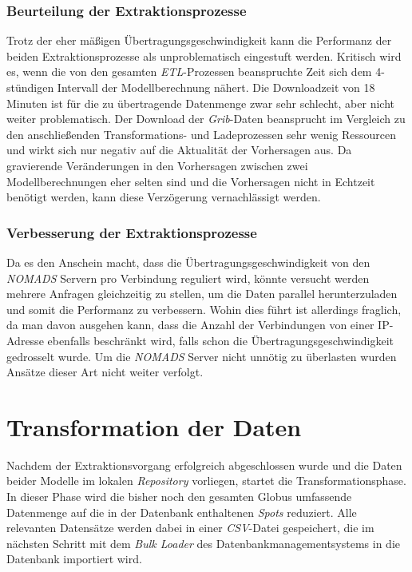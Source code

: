 \subsubsection{Beurteilung der Extraktionsprozesse}
Trotz der eher mäßigen Übertragungsgeschwindigkeit kann die Performanz
der beiden Extraktionsprozesse als unproblematisch eingestuft
werden. Kritisch wird es, wenn die von den gesamten
\textit{ETL}-Prozessen beanspruchte Zeit sich dem 4-stündigen
Intervall der Modellberechnung nähert. Die Downloadzeit von 18 Minuten
ist für die zu übertragende Datenmenge zwar sehr schlecht, aber nicht
weiter problematisch. Der Download der \textit{Grib}-Daten beansprucht
im Vergleich zu den anschließenden Transformations- und Ladeprozessen
sehr wenig Ressourcen und wirkt sich nur negativ auf die Aktualität
der Vorhersagen aus. Da gravierende Veränderungen in den Vorhersagen
zwischen zwei Modellberechnungen eher selten sind und die Vorhersagen
nicht in Echtzeit benötigt werden, kann diese Verzögerung
vernachlässigt werden. 

\subsubsection{Verbesserung der Extraktionsprozesse}
Da es den Anschein macht, dass die Übertragungsgeschwindigkeit von den
\textit{NOMADS} Servern pro Verbindung reguliert wird, könnte versucht
werden mehrere Anfragen gleichzeitig zu stellen, um die Daten parallel
herunterzuladen und somit die Performanz zu verbessern. Wohin dies
führt ist allerdings fraglich, da man davon ausgehen kann, dass die
Anzahl der Verbindungen von einer IP-Adresse ebenfalls beschränkt
wird, falls schon die Übertragungsgeschwindigkeit gedrosselt wurde. Um
die \textit{NOMADS} Server nicht unnötig zu überlasten wurden Ansätze
dieser Art nicht weiter verfolgt.

\section{Transformation der Daten}
Nachdem der Extraktionsvorgang erfolgreich abgeschlossen wurde und die
Daten beider Modelle im lokalen \textit{Repository} vorliegen, startet
die Transformationsphase. In dieser Phase wird die bisher noch den
gesamten Globus umfassende Datenmenge auf die in der Datenbank
enthaltenen \textit{Spots} reduziert. Alle relevanten Datensätze
werden dabei in einer \textit{CSV}-Datei
 gespeichert, die im
nächsten Schritt mit dem \textit{Bulk Loader} des
Datenbankmanagementsystems in die Datenbank importiert wird.


